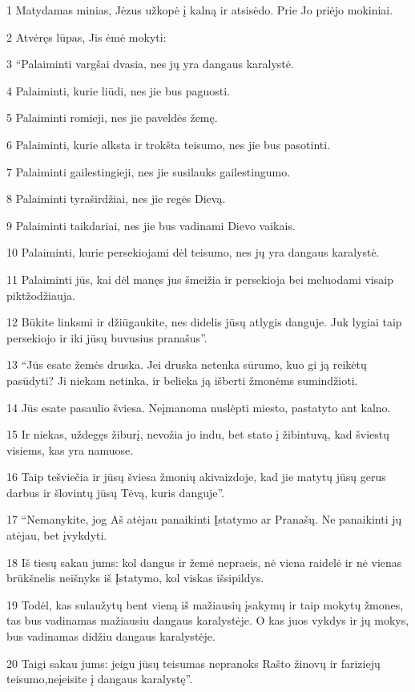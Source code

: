 \par 1 Matydamas minias, Jėzus užkopė į kalną ir atsisėdo. Prie Jo priėjo mokiniai. 
\par 2 Atvėręs lūpas, Jis ėmė mokyti: 
\par 3 “Palaiminti vargšai dvasia, nes jų yra dangaus karalystė. 
\par 4 Palaiminti, kurie liūdi, nes jie bus paguosti. 
\par 5 Palaiminti romieji, nes jie paveldės žemę. 
\par 6 Palaiminti, kurie alksta ir trokšta teisumo, nes jie bus pasotinti. 
\par 7 Palaiminti gailestingieji, nes jie susilauks gailestingumo. 
\par 8 Palaiminti tyraširdžiai, nes jie regės Dievą. 
\par 9 Palaiminti taikdariai, nes jie bus vadinami Dievo vaikais. 
\par 10 Palaiminti, kurie persekiojami dėl teisumo, nes jų yra dangaus karalystė. 
\par 11 Palaiminti jūs, kai dėl manęs jus šmeižia ir persekioja bei meluodami visaip piktžodžiauja. 
\par 12 Būkite linksmi ir džiūgaukite, nes didelis jūsų atlygis danguje. Juk lygiai taip persekiojo ir iki jūsų buvusius pranašus”. 
\par 13 “Jūs esate žemės druska. Jei druska netenka sūrumo, kuo gi ją reikėtų pasūdyti? Ji niekam netinka, ir belieka ją išberti žmonėms sumindžioti. 
\par 14 Jūs esate pasaulio šviesa. Neįmanoma nuslėpti miesto, pastatyto ant kalno. 
\par 15 Ir niekas, uždegęs žiburį, nevožia jo indu, bet stato į žibintuvą, kad šviestų visiems, kas yra namuose. 
\par 16 Taip tešviečia ir jūsų šviesa žmonių akivaizdoje, kad jie matytų jūsų gerus darbus ir šlovintų jūsų Tėvą, kuris danguje”. 
\par 17 “Nemanykite, jog Aš atėjau panaikinti Įstatymo ar Pranašų. Ne panaikinti jų atėjau, bet įvykdyti. 
\par 18 Iš tiesų sakau jums: kol dangus ir žemė nepraeis, nė viena raidelė ir nė vienas brūkšnelis neišnyks iš Įstatymo, kol viskas išsipildys. 
\par 19 Todėl, kas sulaužytų bent vieną iš mažiausių įsakymų ir taip mokytų žmones, tas bus vadinamas mažiausiu dangaus karalystėje. O kas juos vykdys ir jų mokys, bus vadinamas didžiu dangaus karalystėje. 
\par 20 Taigi sakau jums: jeigu jūsų teisumas nepranoks Rašto žinovų ir fariziejų teisumo,­neįeisite į dangaus karalystę”. 
